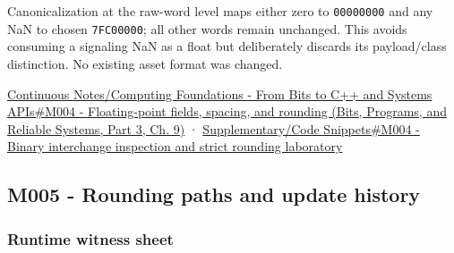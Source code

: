 Canonicalization at the raw-word level maps either zero to \texttt{00000000} and any NaN to chosen \texttt{7FC00000}; all other words remain unchanged. This avoids consuming a signaling NaN as a float but deliberately discards its payload/class distinction. No existing asset format was changed.

\href{../01-Bits-Programs-and-Reliable-Systems-P03/main.pdf\#nameddest=01-foundations-i-ch011-m004---floating-point-fields-spacing-and-rounding}{Continuous Notes/Computing Foundations - From Bits to C++ and Systems APIs\#M004 - Floating-point fields, spacing, and rounding (Bits, Programs, and Reliable Systems, Part 3, Ch. 9)} · \hyperref[appendix-4e2236f53445-m004---binary-interchange-inspection-and-strict-rounding-laboratory]{Supplementary/Code Snippets\#M004 - Binary interchange inspection and strict rounding laboratory}

\subsection{M005 - Rounding paths and update history}\label{appendix-92ff77d4dfdc-m005---rounding-paths-and-update-history}

\hypertarget{appendix-92ff77d4dfdc-m005---rounding-paths-and-update-history}{}

\subsubsection{Runtime witness sheet}\label{appendix-92ff77d4dfdc-runtime-witness-sheet}

\hypertarget{appendix-92ff77d4dfdc-runtime-witness-sheet}{}

